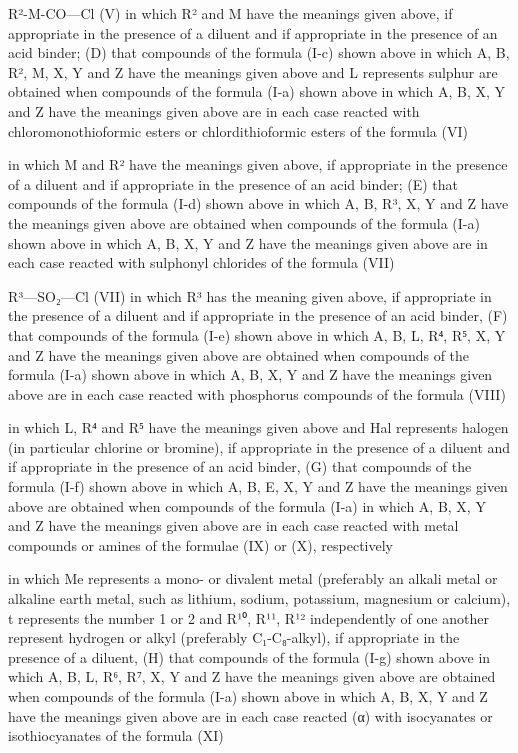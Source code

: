 \documentclass[11pt,a4paper]{article}
\begin{document}
R²-M-CO—Cl (V) in which R² and M have the meanings given above, if appropriate in the presence of a diluent and if appropriate in the presence of an acid binder; (D) that compounds of the formula (I-c) shown above in which A, B, R², M, X, Y and Z have the meanings given above and L represents sulphur are obtained when compounds of the formula (I-a) shown above in which A, B, X, Y and Z have the meanings given above are in each case reacted with chloromonothioformic esters or chlordithioformic esters of the formula (VI)

in which M and R² have the meanings given above, if appropriate in the presence of a diluent and if appropriate in the presence of an acid binder; (E) that compounds of the formula (I-d) shown above in which A, B, R³, X, Y and Z have the meanings given above are obtained when compounds of the formula (I-a) shown above in which A, B, X, Y and Z have the meanings given above are in each case reacted with sulphonyl chlorides of the formula (VII)

R³—SO₂—Cl (VII) in which R³ has the meaning given above, if appropriate in the presence of a diluent and if appropriate in the presence of an acid binder, (F) that compounds of the formula (I-e) shown above in which A, B, L, R⁴, R⁵, X, Y and Z have the meanings given above are obtained when compounds of the formula (I-a) shown above in which A, B, X, Y and Z have the meanings given above are in each case reacted with phosphorus compounds of the formula (VIII)

in which L, R⁴ and R⁵ have the meanings given above and Hal represents halogen (in particular chlorine or bromine), if appropriate in the presence of a diluent and if appropriate in the presence of an acid binder, (G) that compounds of the formula (I-f) shown above in which A, B, E, X, Y and Z have the meanings given above are obtained when compounds of the formula (I-a) in which A, B, X, Y and Z have the meanings given above are in each case reacted with metal compounds or amines of the formulae (IX) or (X), respectively

in which Me represents a mono- or divalent metal (preferably an alkali metal or alkaline earth metal, such as lithium, sodium, potassium, magnesium or calcium), t represents the number 1 or 2 and R¹⁰, R¹¹, R¹² independently of one another represent hydrogen or alkyl (preferably C₁-C₈-alkyl), if appropriate in the presence of a diluent, (H) that compounds of the formula (I-g) shown above in which A, B, L, R⁶, R⁷, X, Y and Z have the meanings given above are obtained when compounds of the formula (I-a) shown above in which A, B, X, Y and Z have the meanings given above are in each case reacted (α) with isocyanates or isothiocyanates of the formula (XI)
\end{document}
